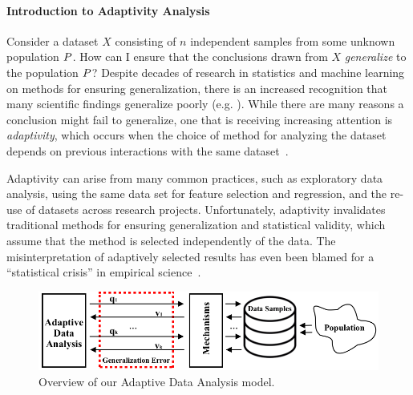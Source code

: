 \paragraph*{Introduction to Adaptivity Analysis}
Consider a dataset $X$ consisting of $n$ independent samples from some unknown population $P$.  How can I ensure that the conclusions drawn from $X$ \emph{generalize} to the population $P$?  Despite decades of research in statistics and machine learning on methods for ensuring generalization, there is an increased recognition that many scientific findings generalize poorly (e.g. 
\cite{Ioannidis05,GelmanL13}
).  While there are many reasons a conclusion might fail to generalize, one that is receiving increasing attention is \emph{adaptivity}, which occurs when the choice of method for analyzing the dataset depends on previous interactions with the same dataset~\cite{GelmanL13}.

 Adaptivity can arise from many common practices, such as exploratory data analysis, using the same data set for feature selection and regression, and the re-use of datasets across research projects.  Unfortunately, adaptivity invalidates traditional methods for ensuring generalization and statistical validity, which assume that the method is selected independently of the data. The misinterpretation of adaptively selected results has even been blamed for a ``statistical crisis'' in empirical science~\cite{GelmanL13}.

\begin{figure}
    \centering
    \includegraphics[width=0.7\columnwidth]{figures/data_analysis_model.png}
    \caption{Overview of our Adaptive Data Analysis model.}
    \label{fig:adaptivity-model-overview}
\vspace{-0.5cm}
\end{figure}

